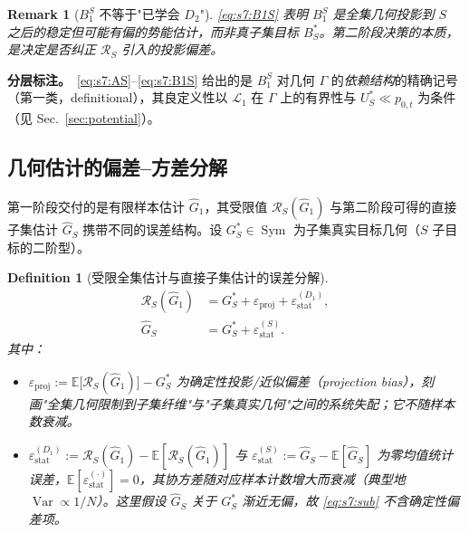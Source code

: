 \documentclass[11pt,a4paper]{article}
\newtheorem{definition}[theorem]{Definition}
\newtheorem{remark}[theorem]{Remark}
\DeclareMathOperator{\Var}{Var}
\newcommand{\E}{\mathbb{E}}
\newcommand{\cL}{\mathcal{L}}   %
\newcommand{\Rstr}{\mathcal{R}}     %
\newcommand{\Sym}{\operatorname{Sym}}
\begin{document}
\begin{remark}[$B_1^S$ 不等于"已学会 $D_2$"]\label{rem:s7:meaning}
\eqref{eq:s7:B1S} 表明 $B_1^S$ 是\emph{全集几何投影到 $S$ 之后}的稳定但可能有偏的势能估计，而非真子集目标 $B_S^*$。第二阶段决策的本质，是决定是否纠正 $\Rstr_S$ 引入的投影偏差。
\end{remark}

\textbf{分层标注。}\ \eqref{eq:s7:AS}--\eqref{eq:s7:B1S} 给出的是 $B_1^S$ 对几何 $\Gamma$ 的\emph{依赖结构}的精确记号（第一类，definitional），其良定义性以 $\cL_1$ 在 $\Gamma$ 上的有界性与 $U_S^*\ll p_{0,t}$ 为条件（见 Sec.~\ref{sec:potential}）。

\subsection{几何估计的偏差--方差分解}

第一阶段交付的是有限样本估计 $\widehat{G}_1$，其受限值 $\Rstr_S(\widehat{G}_1)$ 与第二阶段可得的直接子集估计 $\widehat{G}_S$ 携带不同的误差结构。设 $G_S^*\in\Sym$ 为子集真实目标几何（$S$ 子目标的二阶型）。

\begin{definition}[受限全集估计与直接子集估计的误差分解]\label{def:s7:decomp}
\begin{align}
\Rstr_S(\widehat{G}_1) &= G_S^* + \varepsilon_{\mathrm{proj}} + \varepsilon_{\mathrm{stat}}^{(D_1)},\label{eq:s7:full}\\
\widehat{G}_S &= G_S^* + \varepsilon_{\mathrm{stat}}^{(S)}.\label{eq:s7:sub}
\end{align}
其中：
\begin{itemize}
\item $\varepsilon_{\mathrm{proj}} := \E\bigl[\Rstr_S(\widehat{G}_1)\bigr]-G_S^*$ 为\emph{确定性投影/近似偏差}（projection bias），刻画"全集几何限制到子集纤维"与"子集真实几何"之间的系统失配；它\emph{不随样本数衰减}。
\item $\varepsilon_{\mathrm{stat}}^{(D_1)} := \Rstr_S(\widehat{G}_1)-\E[\Rstr_S(\widehat{G}_1)]$ 与 $\varepsilon_{\mathrm{stat}}^{(S)} := \widehat{G}_S-\E[\widehat{G}_S]$ 为\emph{零均值统计误差}，$\E[\varepsilon_{\mathrm{stat}}^{(\cdot)}]=0$，其协方差随对应样本计数增大而衰减（典型地 $\Var\propto 1/N$）。这里假设 $\widehat{G}_S$ 关于 $G_S^*$ 渐近无偏，故 \eqref{eq:s7:sub} 不含确定性偏差项。
\end{itemize}
\end{definition}
\end{document}

